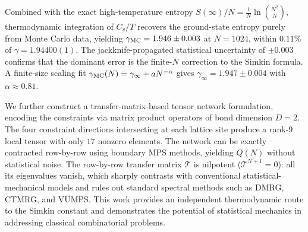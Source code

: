 \begin{abstract*}
Combined with the exact high-temperature entropy
$S(\infty)/N=\frac{1}{N}\ln\binom{N^2}{N}$, thermodynamic integration
of $C_v/T$ recovers the ground-state entropy purely from Monte Carlo
data, yielding $\gamma_{\rm MC}=1.946\pm0.003$ at $N=1024$, within $0.11\%$ of
$\gamma=1.94400(1)$. The jackknife-propagated statistical uncertainty of
$\pm0.003$ confirms that the dominant error is the finite-$N$ correction to the
Simkin formula. A finite-size scaling fit
$\gamma_{\rm MC}(N)=\gamma_\infty+aN^{-\alpha}$ gives
$\gamma_\infty=1.947\pm0.004$ with $\alpha\approx0.81$.

We further construct a transfer-matrix-based tensor network formulation,
encoding the constraints via matrix product operators of bond dimension $D=2$.
The four constraint directions intersecting at each lattice site produce a
rank-9 local tensor with only $17$ nonzero elements. The network can be exactly
contracted row-by-row using boundary MPS methods, yielding $Q(N)$ without
statistical noise. The row-by-row transfer matrix $\mathcal{T}$ is nilpotent
($\mathcal{T}^{N+1}=0$): all its eigenvalues vanish, which sharply contrasts
with conventional statistical-mechanical models and rules out standard spectral
methods such as DMRG, CTMRG, and VUMPS. This work provides an independent
thermodynamic route to the Simkin constant and demonstrates the potential of
statistical mechanics in addressing classical combinatorial problems.
\end{abstract*}
